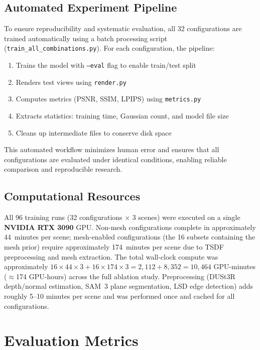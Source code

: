 \subsection{Automated Experiment Pipeline}

To ensure reproducibility and systematic evaluation, all 32 configurations are trained automatically using a batch processing script (\texttt{train\_\allowbreak all\_\allowbreak combinations.py}). For each configuration, the pipeline:

\begin{enumerate}
    \item Trains the model with \texttt{--eval} flag to enable train/test split
    \item Renders test views using \texttt{render.py}
    \item Computes metrics (PSNR, SSIM, LPIPS) using \texttt{metrics.py}
    \item Extracts statistics: training time, Gaussian count, and model file size
    \item Cleans up intermediate files to conserve disk space
\end{enumerate}

This automated workflow minimizes human error and ensures that all configurations are evaluated under identical conditions, enabling reliable comparison and reproducible research.

\subsection{Computational Resources}

All 96 training runs (32 configurations $\times$ 3 scenes) were executed on a single \textbf{NVIDIA RTX 3090} GPU. Non-mesh configurations complete in approximately 44~minutes per scene; mesh-enabled configurations (the 16 subsets containing the mesh prior) require approximately 174~minutes per scene due to TSDF preprocessing and mesh extraction. The total wall-clock compute was approximately $16 \times 44 \times 3 + 16 \times 174 \times 3 = 2{,}112 + 8{,}352 = 10{,}464$ GPU-minutes ($\approx$174 GPU-hours) across the full ablation study. Preprocessing (DUSt3R depth/normal estimation, SAM~3 plane segmentation, LSD edge detection) adds roughly 5--10 minutes per scene and was performed once and cached for all configurations.

\section{Evaluation Metrics}
\label{sec:quality_metrics}

